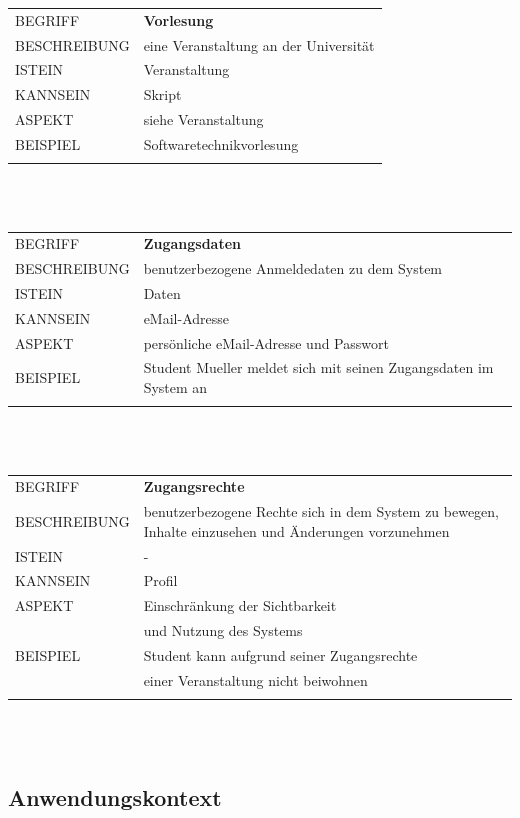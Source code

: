 \documentclass[12pt,a4paper]{article}
\begin{document}
\begin{tabular}{l p{12cm}} 
BEGRIFF 	 & \textbf{Vorlesung} \\ 
BESCHREIBUNG & eine Veranstaltung an der Universität\\ 
ISTEIN   	 & Veranstaltung\\
KANNSEIN 	 & Skript\\ 
ASPEKT   	 & siehe Veranstaltung\\
BEISPIEL 	 & Softwaretechnikvorlesung\\\\
\hline
\end{tabular}\\\\  

\begin{tabular}{l p{12cm}}
BEGRIFF 	 & \textbf{Zugangsdaten} \\ 
BESCHREIBUNG & benutzerbezogene Anmeldedaten zu dem System\\ 
ISTEIN   	 & Daten\\
KANNSEIN 	 & eMail-Adresse\\  
ASPEKT   	 & persönliche eMail-Adresse und Passwort\\
BEISPIEL 	 & Student Mueller meldet sich mit seinen Zugangsdaten im System 				   an\\\\
\hline
\end{tabular}\\\\  

\begin{tabular}{l p{12cm}}
BEGRIFF 	 & \textbf{Zugangsrechte} \\ 
BESCHREIBUNG & benutzerbezogene Rechte sich in dem System zu bewegen, Inhalte einzusehen und Änderungen vorzunehmen \\ 
ISTEIN   	 & - \\
KANNSEIN 	 & Profil\\ 
ASPEKT   	 & Einschränkung der Sichtbarkeit\\
			 & und Nutzung des Systems \\
BEISPIEL 	 & Student kann aufgrund seiner Zugangsrechte\\
			 & einer Veranstaltung nicht beiwohnen\\\\
\hline
\end{tabular}\\\\ 
\newpage

\subsection{Anwendungskontext}
\end{document}
